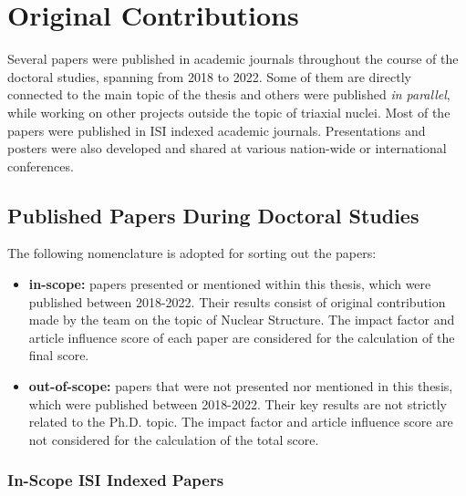 \chapter{Original Contributions}
\label{appendix:contributions}

Several papers were published in academic journals throughout the course of the doctoral studies, spanning from 2018 to 2022. Some of them are directly connected to the main topic of the thesis and others were published \emph{in parallel}, while working on other projects outside the topic of triaxial nuclei. Most of the papers were published in ISI indexed academic journals. Presentations and posters were also developed and shared at various nation-wide or international conferences.

\section{Published Papers During Doctoral Studies}

The following nomenclature is adopted for sorting out the papers:
\begin{itemize}
    \item \textbf{in-scope:} papers presented or mentioned within this thesis, which were published between 2018-2022. Their results consist of original contribution made by the team on the topic of Nuclear Structure. The impact factor and article influence score of each paper are considered for the calculation of the final score.
    \item \textbf{out-of-scope:} papers that were not presented nor mentioned in this thesis, which were published between 2018-2022. Their key results are not strictly related to the Ph.D. topic. The impact factor and article influence score are not considered for the calculation of the total score.
\end{itemize}

\subsection{In-Scope ISI Indexed Papers}

